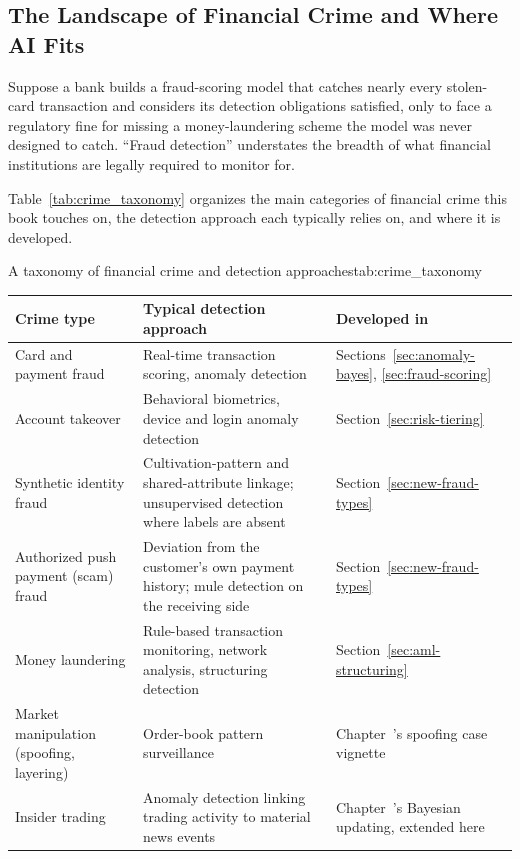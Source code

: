 \documentclass[../ai_in_finance]{subfiles}
\begin{document}
\subsection{The Landscape of Financial Crime and Where AI Fits}
\label{sec:crime-taxonomy}

Suppose a bank builds a fraud-scoring model that catches nearly every stolen-card transaction and considers its detection obligations satisfied, only to face a regulatory fine for missing a money-laundering scheme the model was never designed to catch. ``Fraud detection'' understates the breadth of what financial institutions are legally required to monitor for.

Table~\ref{tab:crime_taxonomy} organizes the main categories of financial crime this book touches on, the detection approach each typically relies on, and where it is developed.

\begin{booktable}[htbp]{A taxonomy of financial crime and detection approaches}{tab:crime_taxonomy}
\begin{tabular}{L{2.8cm}L{5.6cm}L{4.0cm}}
\toprule
Crime type & Typical detection approach & Developed in \\
\midrule
Card and payment fraud & Real-time transaction scoring, anomaly detection & Sections~\ref{sec:anomaly-bayes}, \ref{sec:fraud-scoring} \\
Account takeover & Behavioral biometrics, device and login anomaly detection & Section~\ref{sec:risk-tiering} \\
Synthetic identity fraud & Cultivation-pattern and shared-attribute linkage; unsupervised detection where labels are absent & Section~\ref{sec:new-fraud-types} \\
Authorized push payment (scam) fraud & Deviation from the customer's own payment history; mule detection on the receiving side & Section~\ref{sec:new-fraud-types} \\
Money laundering & Rule-based transaction monitoring, network analysis, structuring detection & Section~\ref{sec:aml-structuring} \\
Market manipulation (spoofing, layering) & Order-book pattern surveillance & Chapter~'s spoofing case vignette \\
Insider trading & Anomaly detection linking trading activity to material news events & Chapter~'s Bayesian updating, extended here \\
\bottomrule
\end{tabular}
\end{booktable}
\end{document}
